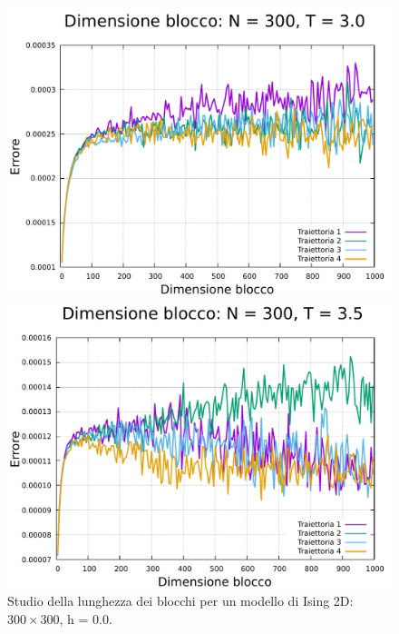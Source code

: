 \begin{figure}[H]
    \begin{minipage}{0.45\textwidth}  
      \centering
      \includegraphics[page=1, width=\textwidth]{Immagini/simIsing2D/metro/lblk/err_300_3.0.pdf}
      \caption{$T\,=\,3.0$}
    \end{minipage}\hfill
    \begin{minipage}{0.45\textwidth}  
      \centering
      \includegraphics[page=1, width=\textwidth]{Immagini/simIsing2D/metro/lblk/err_300_3.5.pdf}
      \caption{$T\,=\,3.5$}
    \end{minipage}
    \caption{Studio della lunghezza dei blocchi per un modello di Ising 2D: $300 \times 300$, h = 0.0.}
\end{figure}

